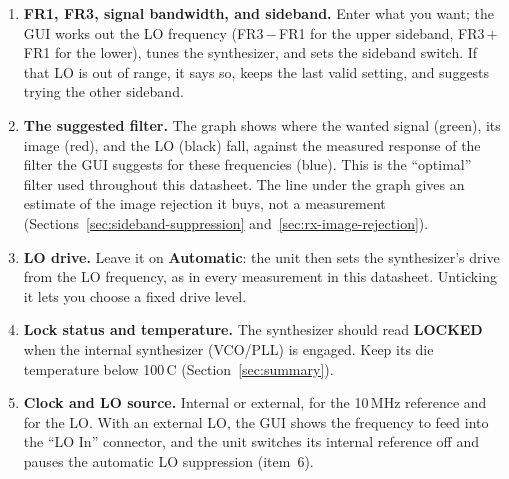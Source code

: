 \par\medskip\noindent\begin{minipage}{\linewidth}\centering
{}
\label{fig:gui-helper}
\end{minipage}\par
\begin{enumerate}
\setlength{\itemsep}{2pt}
\item \textbf{FR1, FR3, signal bandwidth, and sideband.} Enter what you want; the GUI works out the LO frequency
  (FR3\,$-$\,FR1 for the upper sideband, FR3\,+\,FR1 for the lower), tunes the synthesizer, and sets the sideband
  switch. If that LO is out of range, it says so, keeps the last valid setting, and suggests trying the other sideband.
\item \textbf{The suggested filter.} The graph shows where the wanted signal (green), its image (red), and the LO
  (black) fall, against the measured response of the filter the GUI suggests for these frequencies (blue). This is the
  ``optimal'' filter used throughout this datasheet. The line under the graph gives an estimate of the image rejection
  it buys, not a measurement (Sections~\ref{sec:sideband-suppression} and~\ref{sec:rx-image-rejection}).
\end{enumerate}

\par\medskip\noindent\begin{minipage}{\linewidth}\centering
{}
\label{fig:gui-clocking}
\end{minipage}\par
\begin{enumerate}
\setcounter{enumi}{2}
\setlength{\itemsep}{2pt}
\item \textbf{LO drive.} Leave it on \textbf{Automatic}: the unit then sets the synthesizer's drive from the LO
  frequency, as in every measurement in this datasheet. Unticking it lets you choose a fixed drive level.
\item \textbf{Lock status and temperature.} The synthesizer should read \textbf{LOCKED} when the internal synthesizer (VCO/PLL) is
  engaged. Keep its die temperature
  below 100\,\textdegree C (Section~\ref{sec:summary}).
\item \textbf{Clock and LO source.} Internal or external, for the 10\,MHz reference and for the LO. With an external
  LO, the GUI shows the frequency to feed into the ``LO In'' connector, and the unit switches its internal reference
  off and pauses the automatic LO suppression (item~6).
\end{enumerate}

